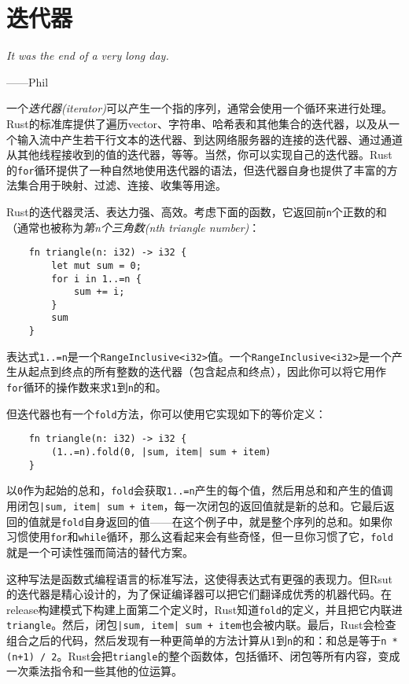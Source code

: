 \chapter{迭代器}\label{ch15}

\emph{It was the end of a very long day.}

\begin{flushright}
    ——Phil
\end{flushright}

一个\emph{迭代器(iterator)}可以产生一个指的序列，通常会使用一个循环来进行处理。Rust的标准库提供了遍历vector、字符串、哈希表和其他集合的迭代器，以及从一个输入流中产生若干行文本的迭代器、到达网络服务器的连接的迭代器、通过通道从其他线程接收到的值的迭代器，等等。当然，你可以实现自己的迭代器。Rust的\texttt{for}循环提供了一种自然地使用迭代器的语法，但迭代器自身也提供了丰富的方法集合用于映射、过滤、连接、收集等用途。

Rust的迭代器灵活、表达力强、高效。考虑下面的函数，它返回前\texttt{n}个正数的和（通常也被称为\emph{第n个三角数(nth triangle number)}：
\begin{verbatim}
    fn triangle(n: i32) -> i32 {
        let mut sum = 0;
        for i in 1..=n {
            sum += i;
        }
        sum
    }
\end{verbatim}

表达式\texttt{1..=n}是一个\texttt{RangeInclusive<i32>}值。一个\texttt{RangeInclusive<i32>}是一个产生从起点到终点的所有整数的迭代器（包含起点和终点），因此你可以将它用作\texttt{for}循环的操作数来求\texttt{1}到\texttt{n}的和。

但迭代器也有一个\texttt{fold}方法，你可以使用它实现如下的等价定义：
\begin{verbatim}
    fn triangle(n: i32) -> i32 {
        (1..=n).fold(0, |sum, item| sum + item)
    }
\end{verbatim}

以\texttt{0}作为起始的总和，\texttt{fold}会获取\texttt{1..=n}产生的每个值，然后用总和和产生的值调用闭包\texttt{|sum, item| sum + item}，每一次闭包的返回值就是新的总和。它最后返回的值就是\texttt{fold}自身返回的值——在这个例子中，就是整个序列的总和。如果你习惯使用\texttt{for}和\texttt{while}循环，那么这看起来会有些奇怪，但一旦你习惯了它，\texttt{fold}就是一个可读性强而简洁的替代方案。

这种写法是函数式编程语言的标准写法，这使得表达式有更强的表现力。但Rsut的迭代器是精心设计的，为了保证编译器可以把它们翻译成优秀的机器代码。在release构建模式下构建上面第二个定义时，Rust知道\texttt{fold}的定义，并且把它内联进\texttt{triangle}。然后，闭包\texttt{|sum, item| sum + item}也会被内联。最后，Rust会检查组合之后的代码，然后发现有一种更简单的方法计算从1到\texttt{n}的和：和总是等于\texttt{n * (n+1) / 2}。Rust会把\texttt{triangle}的整个函数体，包括循环、闭包等所有内容，变成一次乘法指令和一些其他的位运算。

